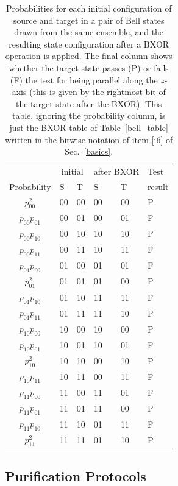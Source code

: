 \begin{table}[htbp]
\begin{center}
\begin{tabular}{c|ll|ll|l}
 &\multicolumn{2}{|c|}{initial}&\multicolumn{2}{|c|}{after BXOR}&Test\\
Probability&S&T&S&T&result\\
\hline
$p_{00}^2$&00&00&00&00&P\\
$p_{00}p_{01}$&00&01&00&01&F\\
$p_{00}p_{10}$&00&10&10&10&P\\
$p_{00}p_{11}$&00&11&10&11&F\\
\hline
$p_{01}p_{00}$&01&00&01&01&F\\
$p_{01}^2$&01&01&01&00&P\\
$p_{01}p_{10}$&01&10&11&11&F\\
$p_{01}p_{11}$&01&11&11&10&P\\
\hline
$p_{10}p_{00}$&10&00&10&00&P\\
$p_{10}p_{01}$&10&01&10&01&F\\
$p_{10}^2$&10&10&00&10&P\\
$p_{10}p_{11}$&10&11&00&11&F\\
\hline
$p_{11}p_{00}$&11&00&11&01&F\\
$p_{11}p_{01}$&11&01&11&00&P\\
$p_{11}p_{10}$&11&10&01&11&F\\
$p_{11}^2$&11&11&01&10&P\\
\end{tabular}
\caption{Probabilities for each initial configuration of source and
target in a pair of Bell states drawn from the same ensemble, and the
resulting state configuration after a BXOR operation is applied.  The
final column shows whether the target state passes (P) or fails (F)
the test for being parallel along the $z$-axis (this is given by the
rightmost bit of the target state after the BXOR).  This table,
ignoring the probability column, is just the BXOR table of
Table~\protect\ref{bell_table} written in the bitwise notation of item
\protect\ref{i6} of Sec.~\protect\ref{basics}.
\label{recursion_table}}
\end{center}
\end{table}
 
\subsection{Purification Protocols}
\label{subsec:pure}
 
